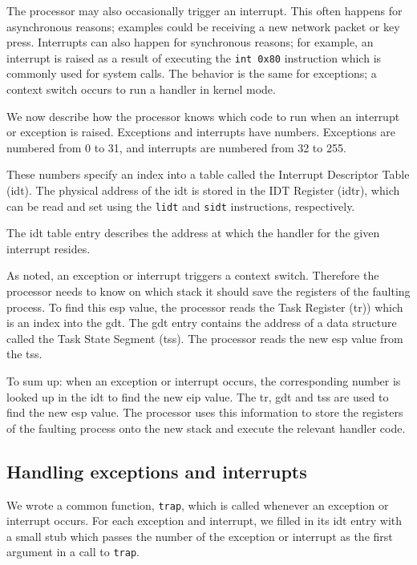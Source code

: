\documentclass{article}
\begin{document}
The processor may also occasionally trigger an interrupt. This often happens
for asynchronous reasons; examples could be receiving a new network packet or
key press. Interrupts can also happen for synchronous reasons; for example, an
interrupt is raised as a result of executing the \texttt{int 0x80} instruction
which is commonly used for system calls. The behavior is the same for
exceptions; a context switch occurs to run a handler in kernel mode.

We now describe how the processor knows which code to run when an interrupt or
exception is raised. Exceptions and interrupts have numbers. Exceptions are
numbered from 0 to 31, and interrupts are numbered from 32 to 255.

These numbers specify an index into a table called the Interrupt Descriptor
Table (\gls{idt}). The physical address of the \gls{idt} is stored in the IDT
Register (\gls{idtr}), which can be read and set using the \texttt{lidt} and
\texttt{sidt} instructions, respectively.

The \gls{idt} table entry describes the address at which the handler for the
given interrupt resides.

As noted, an exception or interrupt triggers a context switch. Therefore the
processor needs to know on which stack it should save the registers of the
faulting process. To find this \gls{esp} value, the processor reads the Task
Register (\gls{tr})) which is an index into the \gls{gdt}. The \gls{gdt} entry
contains the address of a data structure called the Task State Segment
(\gls{tss}). The processor reads the new \gls{esp} value from the \gls{tss}.

To sum up: when an exception or interrupt occurs, the corresponding number is
looked up in the \gls{idt} to find the new \gls{eip} value. The \gls{tr},
\gls{gdt} and \gls{tss} are used to find the new \gls{esp} value. The
processor uses this information to store the registers of the faulting process
onto the new stack and execute the relevant handler code.


\subsection{Handling exceptions and interrupts}
We wrote a common function, \texttt{trap}, which is called whenever an
exception or interrupt occurs. For each exception and interrupt, we filled in
its \gls{idt} entry with a small stub which passes the number of the exception
or interrupt as the first argument in a call to \texttt{trap}.
\end{document}
